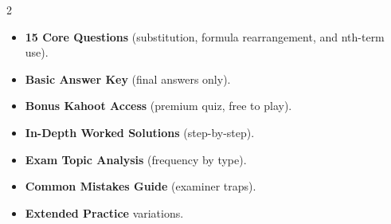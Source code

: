 \documentclass[11pt,a4paper]{article}
\newcommand{\FullReleaseDate}{April 30, 2026}
\begin{document}
\vspace{8pt}

\begin{multicols}{2}
  \begin{tcolorbox}[card, title=\sffamily\bfseries\textcolor{white}{\faHandPointDown\ TODAY (Simplified Version)}, colbacktitle=mainblue, boxed title style={sharp corners, boxrule=0pt}]
    \begin{itemize}[leftmargin=1.2em, itemsep=2pt]
      \item \small \textbf{15 Core Questions} (substitution, formula rearrangement, and nth-term use).
      \item \small \textbf{Basic Answer Key} (final answers only).
      \item \small \textbf{Bonus Kahoot Access} (premium quiz, free to play).
    \end{itemize}
  \end{tcolorbox}

  \columnbreak

  \begin{tcolorbox}[card, title=\sffamily\bfseries\textcolor{white}{\faRocket\ ON \FullReleaseDate\ (Full Upgrade)}, colbacktitle=mainblue, boxed title style={sharp corners, boxrule=0pt}]
    \begin{itemize}[leftmargin=1.2em, itemsep=2pt]
      \item \small \textbf{In-Depth Worked Solutions} (step-by-step).
      \item \small \textbf{Exam Topic Analysis} (frequency by type).
      \item \small \textbf{Common Mistakes Guide} (examiner traps).
      \item \small \textbf{Extended Practice} variations.
    \end{itemize}
  \end{tcolorbox}
\end{multicols}
\end{document}
